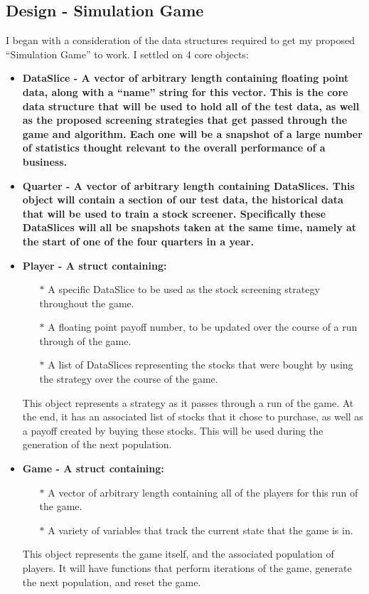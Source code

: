 \subsection{Design - Simulation Game}
I began with a consideration of the data structures required to get my proposed ``Simulation Game'' to work. I settled on 4 core objects:
\begin{itemize}
    \item \bf DataSlice \rm - A vector of arbitrary length containing floating point data, along with a ``name'' string for this vector. This is the core data structure that will be used to hold all of the test data, as well as the proposed screening strategies that get passed through the game and algorithm. Each one will be a snapshot of a large number of statistics thought relevant to the overall performance of a business.
    \item \bf Quarter \rm - A vector of arbitrary length containing DataSlices. This object will contain a section of our test data, the historical data that will be used to train a stock screener. Specifically these DataSlices will all be snapshots taken at the same time, namely at the start of one of the four quarters in a year.
    \item \bf Player \rm - A struct containing:
    \begin{itemize}
        \item[$\ast$] A specific DataSlice to be used as the stock screening strategy throughout the game.
        \item[$\ast$] A floating point payoff number, to be updated over the course of a run through of the game.
        \item[$\ast$] A list of DataSlices representing the stocks that were bought by using the strategy over the course of the game.
    \end{itemize}
    This object represents a strategy as it passes through a run of the game. At the end, it has an associated list of stocks that it chose to purchase, as well as a payoff created by buying these stocks. This will be used during the generation of the next population.
    \item \bf Game \rm - A struct containing:
    \begin{itemize}
        \item[$\ast$] A vector of arbitrary length containing all of the players for this run of the game.
        \item[$\ast$] A variety of variables that track the current state that the game is in.
    \end{itemize}
        This object represents the game itself, and the associated population of players. It will have functions that perform iterations of the game, generate the next population, and reset the game.
\end{itemize}
